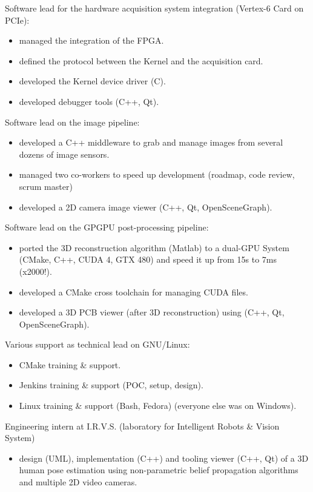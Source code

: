 \documentclass{article}
\begin{document}
\begin{llist}
{%
Software lead for the hardware acquisition system integration (Vertex-6 Card on PCIe):
\vspace{-0.33cm}
\begin{itemize}
\item managed the integration of the FPGA.
\item defined the protocol between the Kernel and the acquisition card.
\item developed the Kernel device driver (C).
\item developed debugger tools (C++, Qt).
\end{itemize}
Software lead on the image pipeline:
\vspace{-0.33cm}
\begin{itemize}
\item developed a C++ middleware to grab and manage images from several dozens of image sensors.
\item managed two co-workers to speed up development (roadmap, code review, scrum master)
\item developed a 2D camera image viewer (C++, Qt, OpenSceneGraph).
\end{itemize}
Software lead on the GPGPU post-processing pipeline:
\vspace{-0.33cm}
\begin{itemize}
\item ported the 3D reconstruction algorithm (Matlab) to a dual-GPU System (CMake, C++, CUDA 4, GTX 480)
 and speed it up from 15s to 7ms (x2000!).
\item developed a CMake cross toolchain for managing CUDA files.
\item developed a 3D PCB viewer (after 3D reconstruction) using (C++, Qt, OpenSceneGraph).
\end{itemize}

Various support as technical lead on GNU/Linux:
\vspace{-0.33cm}
\begin{itemize}
\item CMake training \& support.
\item Jenkins training \& support (POC, setup, design).
\item Linux training \& support (Bash, Fedora) (everyone else was on Windows).
\end{itemize}
} {}

 {
Engineering intern at I.R.V.S. (laboratory for Intelligent Robots \& Vision System)
\vspace{-0.33cm}
\begin{itemize}
\item design (UML), implementation (C++) and tooling viewer (C++, Qt) of a
3D human pose estimation using non-parametric belief propagation
algorithms and multiple 2D video cameras.
\end{itemize}
} {}


\end{llist}
\end{document}
